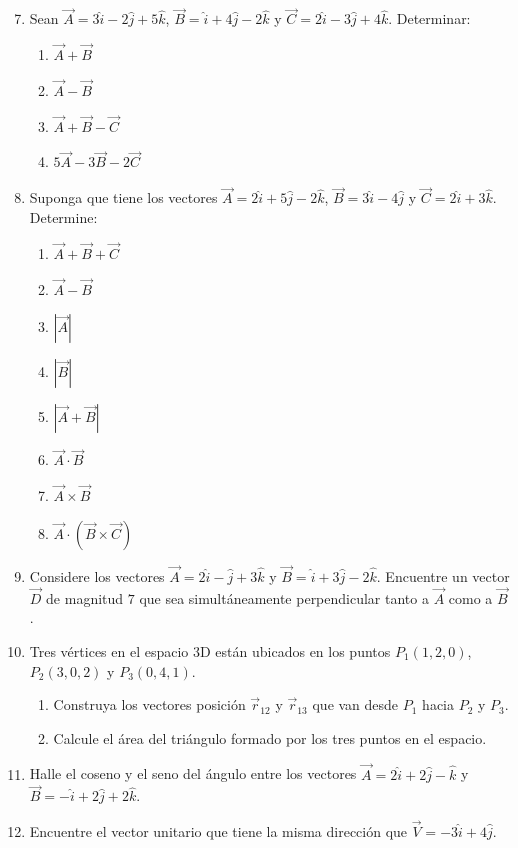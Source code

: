 \documentclass[11pt, letterpaper]{article}
\begin{document}
   \begin{enumerate}
   	\setcounter{enumi}{6}
   	
   	\item Sean $\vec{A} = 3\hat{i} - 2\hat{j} + 5\hat{k}$, $\vec{B} = \hat{i} + 4\hat{j} - 2\hat{k}$ y $\vec{C} = 2\hat{i} - 3\hat{j} + 4\hat{k}$. Determinar:
   	\begin{enumerate}
   		\item $\vec{A} + \vec{B}$
   		\item $\vec{A} - \vec{B}$
   		\item $\vec{A} + \vec{B} - \vec{C}$
   		\item $5\vec{A} - 3\vec{B} - 2\vec{C}$
   	\end{enumerate}
   	
   	\item Suponga que tiene los vectores $\vec{A} = 2\hat{i} + 5\hat{j} - 2\hat{k}$, $\vec{B} = 3\hat{i} - 4\hat{j}$ y $\vec{C} = 2\hat{i} + 3\hat{k}$. Determine:
   	\begin{enumerate}
   		\item $\vec{A} + \vec{B} + \vec{C}$
   		\item $\vec{A} - \vec{B}$
   		\item $|\vec{A}|$
   		\item $|\vec{B}|$
   		\item $|\vec{A} + \vec{B}|$
   		\item $\vec{A} \cdot \vec{B}$
   		\item $\vec{A} \times \vec{B}$
   		\item $\vec{A} \cdot (\vec{B} \times \vec{C})$
   	\end{enumerate}
   	
   	\item Considere los vectores $\vec{A} = 2\hat{i} - \hat{j} + 3\hat{k}$ y $\vec{B} = \hat{i} + 3\hat{j} - 2\hat{k}$. Encuentre un vector $\vec{D}$ de magnitud $7$ que sea simultáneamente perpendicular tanto a $\vec{A}$ como a $\vec{B}$.
   
   \item Tres vértices en el espacio $3\text{D}$ están ubicados en los puntos $P_1(1, 2, 0)$, $P_2(3, 0, 2)$ y $P_3(0, 4, 1)$.
   \begin{enumerate}
   	\item Construya los vectores posición $\vec{r}_{12}$ y $\vec{r}_{13}$ que van desde $P_1$ hacia $P_2$ y $P_3$.
   	\item Calcule el área del triángulo formado por los tres puntos en el espacio.
   \end{enumerate}
   	
   	\item Halle el coseno y el seno del ángulo entre los vectores $\vec{A} = 2\hat{i} + 2\hat{j} - \hat{k}$ y $\vec{B} = -\hat{i} + 2\hat{j} + 2\hat{k}$.
   	
   	\item Encuentre el vector unitario que tiene la misma dirección que $\vec{V} = -3\hat{i} + 4\hat{j}$.
   	
   \end{enumerate}
   
\end{document}

